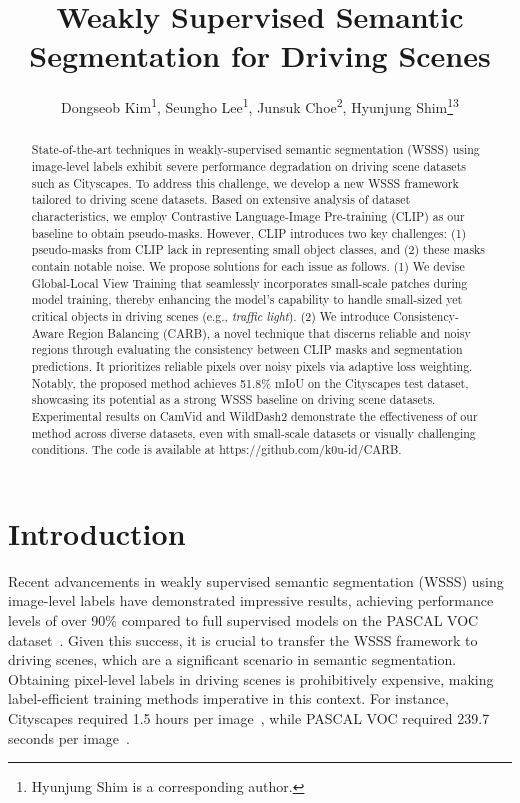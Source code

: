 \documentclass[letterpaper]{article} %
\title{Weakly Supervised Semantic Segmentation for Driving Scenes}
\author{
    Dongseob Kim\equalcontrib\textsuperscript{\rm 1},
    Seungho Lee\equalcontrib\textsuperscript{\rm 1},
    Junsuk Choe\textsuperscript{\rm 2},
    Hyunjung Shim\thanks{Hyunjung Shim is a corresponding author.}\textsuperscript{\rm 3}
}
\def\eg{e.g.} \def\Eg{E.g.}
\begin{document}
\maketitle

\begin{abstract}
State-of-the-art techniques in weakly-supervised semantic segmentation (WSSS) using image-level labels exhibit severe performance degradation on driving scene datasets such as Cityscapes. To address this challenge, we develop a new WSSS framework tailored to driving scene datasets. Based on extensive analysis of dataset characteristics, we employ Contrastive Language-Image Pre-training (CLIP) as our baseline to obtain pseudo-masks. However, CLIP introduces two key challenges: (1) pseudo-masks from CLIP lack in representing small object classes, and (2) these masks contain notable noise. We propose solutions for each issue as follows. (1) We devise Global-Local View Training that seamlessly incorporates small-scale patches during model training, thereby enhancing the model's capability to handle small-sized yet critical objects in driving scenes (\eg, \textit{traffic light}). (2) We introduce Consistency-Aware Region Balancing (CARB), a novel technique that discerns reliable and noisy regions through evaluating the consistency between CLIP masks and segmentation predictions. It prioritizes reliable pixels over noisy pixels via adaptive loss weighting. Notably, the proposed method achieves 51.8\% mIoU on the Cityscapes test dataset, showcasing its potential as a strong WSSS baseline on driving scene datasets. Experimental results on CamVid and WildDash2 demonstrate the effectiveness of our method across diverse datasets, even with small-scale datasets or visually challenging conditions. The code is available at https://github.com/k0u-id/CARB.
\end{abstract}

\section{Introduction}

Recent advancements in weakly supervised semantic segmentation (WSSS) using image-level labels have demonstrated impressive results, achieving performance levels of over 90\% compared to full supervised models on the PASCAL VOC dataset~\cite{lee2022threshold,yoon2022adversarial}. Given this success, it is crucial to transfer the WSSS framework to driving scenes, which are a significant scenario in semantic segmentation. Obtaining pixel-level labels in driving scenes is prohibitively expensive, making label-efficient training methods imperative in this context. For instance, Cityscapes required 1.5 hours per image~\cite{cordts2016cityscapes}, while PASCAL VOC required 239.7 seconds per image~\cite{bearman2016s}.
\end{document}
